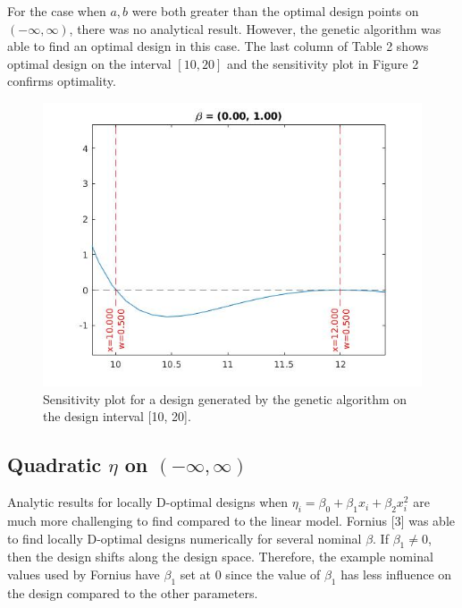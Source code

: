 \documentclass[11pt,a4paper]{article}
\begin{document}
For the case when $a,b$ were both greater than the optimal design points on $(-\infty, \infty)$, there was no analytical result. However, the genetic algorithm was able to find an optimal design in this case. The last column of Table 2 shows optimal design on the interval $[10,20]$ and the sensitivity plot in Figure 2 confirms optimality.

\begin{figure}
\centering
\includegraphics[scale=0.5]{figures/fig2.jpg}
\caption{Sensitivity plot for a design generated by the genetic algorithm on the design interval [10, 20].}
\end{figure}

\subsection{Quadratic $\eta$ on $(-\infty, \infty)$}
Analytic results for locally D-optimal designs when $\eta_i = \beta_0 + \beta_1 x_i + \beta_2 x_i^2$ are much more challenging to find compared to the linear model. Fornius [3] was able to find locally D-optimal designs numerically for several nominal $\beta$. If $\beta_1 \neq 0$, then the design shifts along the design space. Therefore, the example nominal values used by Fornius have $\beta_1$ set at 0 since the value of $\beta_1$ has less influence on the design compared to the other parameters.
\end{document}
